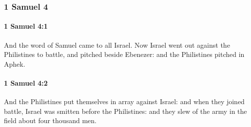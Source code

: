	\subsubsection{1 Samuel 4} %
		\label{1SAMUEL-4}

		\paragraph{1 Samuel 4:1} %
			\label{1SAMUEL-4-1}

			And the word of Samuel came to all Israel. Now Israel went out against the Philistines to battle, and pitched beside Ebenezer: and the Philistines pitched in Aphek.


		\paragraph{1 Samuel 4:2} %
			\label{1SAMUEL-4-2}

			And the Philistines put themselves in array against Israel: and when they joined battle, Israel was smitten before the Philistines: and they slew of the army in the field about four thousand men.

